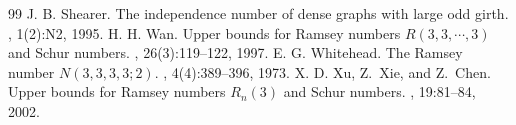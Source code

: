 \documentclass[10pt,a4paper]{amsart}
\begin{document}
\begin{thebibliography}{99}
 {J. B.} Shearer. \newblock The independence number of dense graphs with large odd girth. , 1(2):N2, 1995.
 {H. H.} Wan. \newblock Upper bounds for {R}amsey numbers {$R(3, 3, \cdots, 3)$} and {S}chur numbers. , 26(3):119--122, 1997.
 {E. G.} Whitehead. \newblock The {R}amsey number {$N(3, 3, 3, 3; 2)$}. , 4(4):389--396, 1973.
 {X. D.} Xu, Z.~Xie, and Z.~Chen. \newblock Upper bounds for {R}amsey numbers {$R_n(3)$} and {S}chur numbers. , 19:81--84, 2002.
\end{thebibliography}
\end{document}
